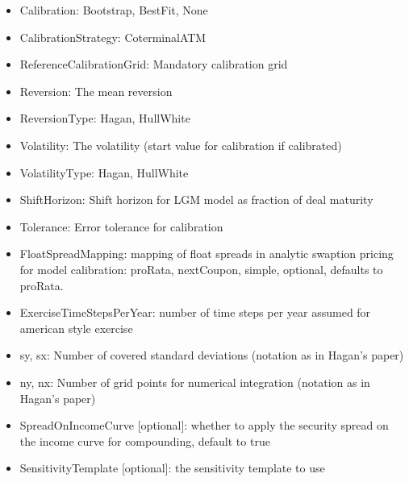 \begin{itemize}
\item Calibration: Bootstrap, BestFit, None
\item CalibrationStrategy: CoterminalATM
\item ReferenceCalibrationGrid: Mandatory calibration grid
\item Reversion: The mean reversion
\item ReversionType: Hagan, HullWhite
\item Volatility: The volatility (start value for calibration if calibrated)
\item VolatilityType: Hagan, HullWhite
\item ShiftHorizon: Shift horizon for LGM model as fraction of deal maturity
\item Tolerance: Error tolerance for calibration
\item FloatSpreadMapping: mapping of float spreads in analytic swaption pricing for model calibration: proRata,
  nextCoupon, simple, optional, defaults to proRata.
\item ExerciseTimeStepsPerYear: number of time steps per year assumed for american style exercise
\item sy, sx: Number of covered standard deviations (notation as in Hagan's paper)
\item ny, nx: Number of grid points for numerical integration (notation as in Hagan's paper)
\item SpreadOnIncomeCurve [optional]: whether to apply the security spread on the income curve for compounding, default to true
\item SensitivityTemplate [optional]: the sensitivity template to use
\end{itemize}

